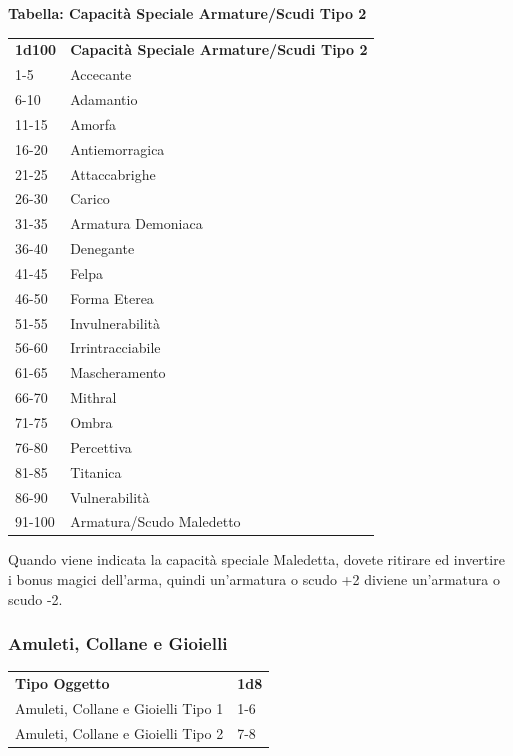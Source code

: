 \begin{multicols}{2}
	\medskip

	\textbf{Tabella: Capacità Speciale Armature/Scudi Tipo 2}

	\begin{tabularx}{0.45\textwidth}{lX}
		\textbf{1d100} & \textbf{Capacità Speciale Armature/Scudi Tipo 2}\\
		1-5 &Accecante\\
		6-10 &Adamantio\\
		11-15& Amorfa\\
		16-20& Antiemorragica\\
		21-25& Attaccabrighe\\
		26-30& Carico\\
		31-35& Armatura Demoniaca\\
		36-40& Denegante\\
		41-45& Felpa\\
		46-50& Forma Eterea\\
		51-55& Invulnerabilità\\
		56-60& Irrintracciabile\\
		61-65 &Mascheramento\\
		66-70 &Mithral\\
		71-75 &Ombra\\
		76-80 &Percettiva\\
		81-85 &Titanica\\
		86-90 &Vulnerabilità\\
		91-100& Armatura/Scudo Maledetto\\
	\end{tabularx}

	\medskip

	Quando viene indicata la capacità speciale Maledetta, dovete ritirare ed invertire i bonus magici dell'arma, quindi un'armatura o scudo +2 diviene un'armatura o scudo -2.

	\subsubsection{Amuleti, Collane e Gioielli}


	\begin{tabular}{ll}
		\textbf{Tipo Oggetto}&\textbf{1d8}\\
		Amuleti, Collane e Gioielli Tipo 1&1-6\\
		Amuleti, Collane e Gioielli Tipo 2&7-8\\
	\end{tabular}


\end{multicols}
